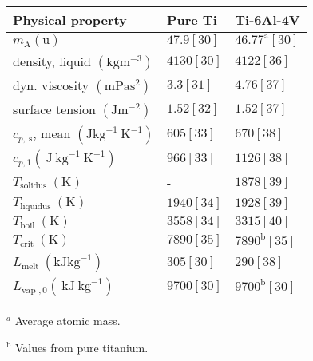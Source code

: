 \documentclass[10pt]{article}
\begin{document}
\begin{center}
\begin{tabular}{lll}
\hline
Physical property & Pure Ti & Ti-6Al-4V \\
\hline
$m_{\mathrm{A}}(\mathrm{u})$ & $47.9[30]$ & $46.77^{\mathrm{a}}[30]$ \\
density, liquid $\left(\mathrm{kg} \mathrm{m}^{-3}\right)$ & $4130[30]$ & $4122[36]$ \\
dyn. viscosity $\left(\mathrm{mPa} \mathrm{s}^{2}\right)$ & $3.3[31]$ & $4.76[37]$ \\
surface tension $\left(\mathrm{J} \mathrm{m}^{-2}\right)$ & $1.52[32]$ & $1.52[37]$ \\
$c_{p, \mathrm{~s}}$, mean $\left(\mathrm{J} \mathrm{kg}^{-1} \mathrm{~K}^{-1}\right)$ & $605[33]$ & $670[38]$ \\
$c_{p, 1}\left(\mathrm{~J} \mathrm{~kg}^{-1} \mathrm{~K}^{-1}\right)$ & $966[33]$ & $1126[38]$ \\
$T_{\text {solidus }}(\mathrm{K})$ & - & $1878[39]$ \\
$T_{\text {liquidus }}(\mathrm{K})$ & $1940[34]$ & $1928[39]$ \\
$T_{\text {boil }}(\mathrm{K})$ & $3558[34]$ & $3315[40]$ \\
$T_{\text {crit }}(\mathrm{K})$ & $7890[35]$ & $7890^{\mathrm{b}}[35]$ \\
$L_{\text {melt }}\left(\mathrm{kJ} \mathrm{kg}^{-1}\right)$ & $305[30]$ & $290[38]$ \\
$L_{\text {vap }, 0}\left(\mathrm{~kJ} \mathrm{~kg}^{-1}\right)$ & $9700[30]$ & $9700^{\mathrm{b}}[30]$ \\
\hline
\end{tabular}
\end{center}

${ }^{a}$ Average atomic mass.

${ }^{\mathrm{b}}$ Values from pure titanium.
\end{document}
